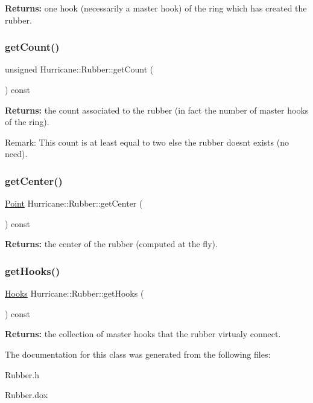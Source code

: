 {\bfseries Returns\+:} one hook (necessarily a master hook) of the ring which has created the rubber. \mbox{\label{classHurricane_1_1Rubber_a5fbe74e46313c0c1a264f0c7bda11e94}} 
\subsubsection{\texorpdfstring{get\+Count()}{getCount()}}
{\footnotesize\ttfamily unsigned Hurricane\+::\+Rubber\+::get\+Count (\begin{DoxyParamCaption}{ }\end{DoxyParamCaption}) const\hspace{0.3cm}{\ttfamily [inline]}}

{\bfseries Returns\+:} the count associated to the rubber (in fact the number of master hooks of the ring).

\begin{DoxyParagraph}{Remark\+: This count is at least equal to two else the rubber doesn\textquotesingle{}t }
exists (no need). 
\end{DoxyParagraph}
\mbox{\label{classHurricane_1_1Rubber_a124ef92401fd95ff794e381acd24e4ff}} 
\subsubsection{\texorpdfstring{get\+Center()}{getCenter()}}
{\footnotesize\ttfamily \mbox{\hyperlink{classHurricane_1_1Point}{Point}} Hurricane\+::\+Rubber\+::get\+Center (\begin{DoxyParamCaption}{ }\end{DoxyParamCaption}) const}

{\bfseries Returns\+:} the center of the rubber (computed at the fly). \mbox{\label{classHurricane_1_1Rubber_a6d87ff89d80fbaeeb6fea4157b92d1e3}} 
\subsubsection{\texorpdfstring{get\+Hooks()}{getHooks()}}
{\footnotesize\ttfamily \mbox{\hyperlink{namespaceHurricane_a9dcd9b74dc5e2b51bec7a13c25807e02}{Hooks}} Hurricane\+::\+Rubber\+::get\+Hooks (\begin{DoxyParamCaption}{ }\end{DoxyParamCaption}) const}

{\bfseries Returns\+:} the collection of master hooks that the rubber virtualy connect. 

The documentation for this class was generated from the following files\+:\begin{DoxyCompactItemize}
\item 
Rubber.\+h\item 
Rubber.\+dox\end{DoxyCompactItemize}
